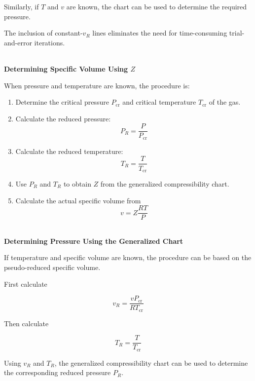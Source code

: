 \documentclass[12pt]{article}
\begin{document}
Similarly, if $T$ and $v$ are known, the chart can be used to determine the required pressure.

The inclusion of constant-$v_R$ lines eliminates the need for time-consuming trial-and-error iterations.

\textbf{\\ Determining Specific Volume Using $Z$}

When pressure and temperature are known, the procedure is:

\begin{enumerate}
    \item Determine the critical pressure $P_{\mathrm{cr}}$ and critical temperature $T_{\mathrm{cr}}$ of the gas.
    \item Calculate the reduced pressure:
    \begin{equation*}
    P_R=\frac{P}{P_{\mathrm{cr}}}
    \end{equation*}
    \item Calculate the reduced temperature:
    \begin{equation*}
    T_R=\frac{T}{T_{\mathrm{cr}}}
    \end{equation*}
    \item Use $P_R$ and $T_R$ to obtain $Z$ from the generalized compressibility chart.
    \item Calculate the actual specific volume from
    \begin{equation*}
    \boxed{
    v=Z\frac{RT}{P}
    }
    \end{equation*}
\end{enumerate}

\textbf{\\ Determining Pressure Using the Generalized Chart}

If temperature and specific volume are known, the procedure can be based on the pseudo-reduced specific volume.

First calculate

\begin{equation*}
\boxed{
v_R=
\frac{vP_{\mathrm{cr}}}
{RT_{\mathrm{cr}}}
}
\end{equation*}

Then calculate

\begin{equation*}
\boxed{
T_R=\frac{T}{T_{\mathrm{cr}}}
}
\end{equation*}

Using $v_R$ and $T_R$, the generalized compressibility chart can be used to determine the corresponding reduced pressure $P_R$.
\end{document}
